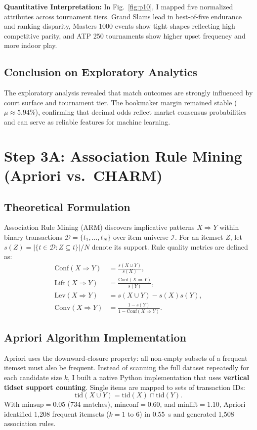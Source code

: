 \documentclass[10pt,journal]{IEEEtran}
\begin{document}
\textbf{Quantitative Interpretation:} In Fig.~\ref{fig:p10}, I mapped five normalized attributes across tournament tiers. Grand Slams lead in best-of-five endurance and ranking disparity, Masters 1000 events show tight shapes reflecting high competitive parity, and ATP 250 tournaments show higher upset frequency and more indoor play.

\subsection{Conclusion on Exploratory Analytics}
The exploratory analysis revealed that match outcomes are strongly influenced by court surface and tournament tier. The bookmaker margin remained stable ($\mu \approx 5.94\%$), confirming that decimal odds reflect market consensus probabilities and can serve as reliable features for machine learning.

\section{Step 3A: Association Rule Mining (Apriori vs.\ CHARM)}

\subsection{Theoretical Formulation}
Association Rule Mining (ARM) discovers implicative patterns $X \Rightarrow Y$ within binary transactions $\mathcal{D} = \{t_1, \dots, t_N\}$ over item universe $\mathcal{I}$. For an itemset $Z$, let $s(Z) = |\{t \in \mathcal{D}: Z \subseteq t\}| / N$ denote its support. Rule quality metrics are defined as:
\begin{align}
    \mathrm{Conf}(X \Rightarrow Y) &= \frac{s(X \cup Y)}{s(X)}, \\
    \mathrm{Lift}(X \Rightarrow Y) &= \frac{\mathrm{Conf}(X \Rightarrow Y)}{s(Y)}, \\
    \mathrm{Lev}(X \Rightarrow Y) &= s(X \cup Y) - s(X)s(Y), \\
    \mathrm{Conv}(X \Rightarrow Y) &= \frac{1 - s(Y)}{1 - \mathrm{Conf}(X \Rightarrow Y)}.
\end{align}

\subsection{Apriori Algorithm Implementation}
Apriori uses the downward-closure property: all non-empty subsets of a frequent itemset must also be frequent. Instead of scanning the full dataset repeatedly for each candidate size $k$, I built a native Python implementation that uses \textbf{vertical tidset support counting}. Single items are mapped to sets of transaction IDs:
\begin{equation}
    \mathrm{tid}(X \cup Y) = \mathrm{tid}(X) \cap \mathrm{tid}(Y).
\end{equation}
With $\text{minsup} = 0.05$ (734 matches), $\text{minconf} = 0.60$, and $\text{minlift} = 1.10$, Apriori identified 1,208 frequent itemsets ($k=1$ to $6$) in 0.55~s and generated 1,508 association rules.
\end{document}
